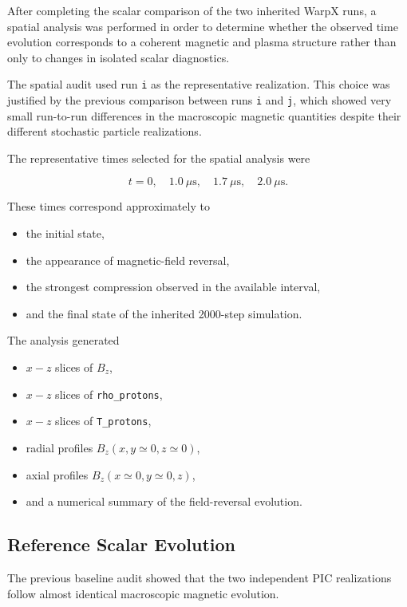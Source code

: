 \documentclass[11pt,a4paper]{article}
\begin{document}
After completing the scalar comparison of the two inherited WarpX runs,
a spatial analysis was performed in order to determine whether the observed
time evolution corresponds to a coherent magnetic and plasma structure rather
than only to changes in isolated scalar diagnostics.

The spatial audit used run \texttt{i} as the representative realization.
This choice was justified by the previous comparison between runs
\texttt{i} and \texttt{j}, which showed very small run-to-run differences
in the macroscopic magnetic quantities despite their different stochastic
particle realizations.

The representative times selected for the spatial analysis were

\[
t =
0,\quad
1.0~\mu\mathrm{s},\quad
1.7~\mu\mathrm{s},\quad
2.0~\mu\mathrm{s}.
\]

These times correspond approximately to

\begin{itemize}
    \item the initial state,
    \item the appearance of magnetic-field reversal,
    \item the strongest compression observed in the available interval,
    \item and the final state of the inherited 2000-step simulation.
\end{itemize}

The analysis generated

\begin{itemize}
    \item \(x-z\) slices of \(B_z\),
    \item \(x-z\) slices of \texttt{rho\_protons},
    \item \(x-z\) slices of \texttt{T\_protons},
    \item radial profiles \(B_z(x,y\simeq0,z\simeq0)\),
    \item axial profiles \(B_z(x\simeq0,y\simeq0,z)\),
    \item and a numerical summary of the field-reversal evolution.
\end{itemize}


\subsection{Reference Scalar Evolution}

The previous baseline audit showed that the two independent PIC realizations
follow almost identical macroscopic magnetic evolution.
\end{document}
